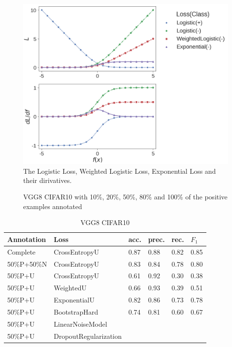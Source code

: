 \begin{figure}[t]
\begin{center}
   \includegraphics[width=0.95\linewidth]{img/losses.png}
\end{center}
   \caption{The Logistic Loss, Weighted Logistic Loss, Exponential Loss and their dirivatives.}
\label{fig:losses}
\end{figure}


\begin{figure}[t]
\begin{center}
\fbox{\rule{0pt}{2in} \rule{0.9\linewidth}{0pt}}
\end{center}
   \caption{VGG8 CIFAR10 with 10\%, 20\%, 50\%, 80\% and 100\% of the positive examples annotated}
\label{fig:percentage}
\end{figure}

\begin{table}
\begin{center}
\begin{tabular}{ll|llll}
Annotation  & Loss & acc. & prec. & rec. & $F_1$ \\
\hline
Complete    & CrossEntropyU    & 0.87 & 0.88 & 0.82 & 0.85 \\
50\%P+50\%N & CrossEntropyU    & 0.83 & 0.84 & 0.78 & 0.80 \\
50\%P+U     & CrossEntropyU    & 0.61 & 0.92 & 0.30 & 0.38 \\
50\%P+U     & WeightedU        & 0.66 & 0.93 & 0.39 & 0.51 \\
50\%P+U     & ExponentialU     & 0.82 & 0.86 & 0.73 & 0.78 \\
50\%P+U     & BootstrapHard    & 0.74 & 0.81 & 0.60 & 0.67 \\
50\%P+U     & LinearNoiseModel & & & & \\
50\%P+U     & DropoutRegularization & & & & \\
\end{tabular}
\end{center}
\caption{VGG8 CIFAR10}
\end{table}


